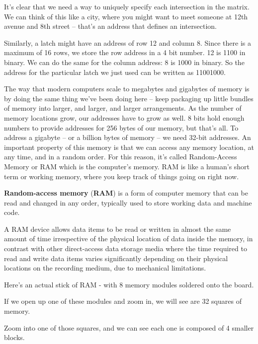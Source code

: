 
It's clear that we need a way to uniquely specify each intersection in the matrix. We can think of this like a city,
where you might want to meet someone at 12th avenue and 8th street -- that's an address that defines an intersection.

\be
Similarly, a latch might have an address of row 12 and column 8. Since there is a maximum of 16 rows, we store the row
address in a 4 bit number. 12 is 1100 in binary. We can do the same for the column address: 8 is 1000 in binary. So
the address for the particular latch we just used can be written as 11001000.
\ee

The way that modern computers scale to megabytes and gigabytes of memory is by doing the same thing we've been doing
here -- keep packaging up little bundles of memory into larger, and larger, and larger arrangements. As the number of
memory locations grow, our addresses have to grow as well. 8 bits hold enough numbers to provide addresses for 256
bytes of our memory, but that's all. To address a gigabyte – or a billion bytes of memory – we need 32-bit addresses.
An important property of this memory is that we can access any memory location, at any time, and in a random order.
For this reason, it's called Random-Access Memory or RAM which is the computer's memory. RAM is like a human's short
term or working memory, where you keep track of things going on right now.

\textbf{Random-access memory} (\textbf{RAM}) is a form of computer memory that can be read and changed in any order,
typically used to store working data and machine code.
\ed

A RAM device allows data items to be read or written in almost the same amount of time irrespective of the physical
location of data inside the memory, in contrast with other direct-access data storage media where the time required
to read and write data items varies significantly depending on their physical locations on the recording medium, due
to mechanical limitations.

\be
Here's an actual stick of RAM - with 8 memory modules soldered onto the board.


If we open up one of these modules and zoom in, we will see are 32 squares of memory.


Zoom into one of those squares, and we can see each one is composed of 4 smaller blocks.

